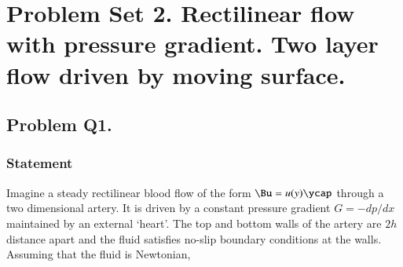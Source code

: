 %
%
%
%
%
%

\chapter{Problem Set 2.  Rectilinear flow with pressure gradient.  Two layer flow driven by moving surface.}
\label{chap:continuumProblemSet2}
\date{Mar 2, 2012}

\beginArtWithToc
%

\section{Problem Q1.}
\subsection{Statement}

Imagine a steady rectilinear blood flow of the form $\Bu = u(y) \ycap$ through a two dimensional artery.  It is driven by a constant pressure gradient $G = -dp/dx$ maintained by an external `heart'.  The top and bottom walls of the artery are $2h$ distance apart and the fluid satisfies no-slip boundary conditions at the walls.  Assuming that the fluid is Newtonian,

